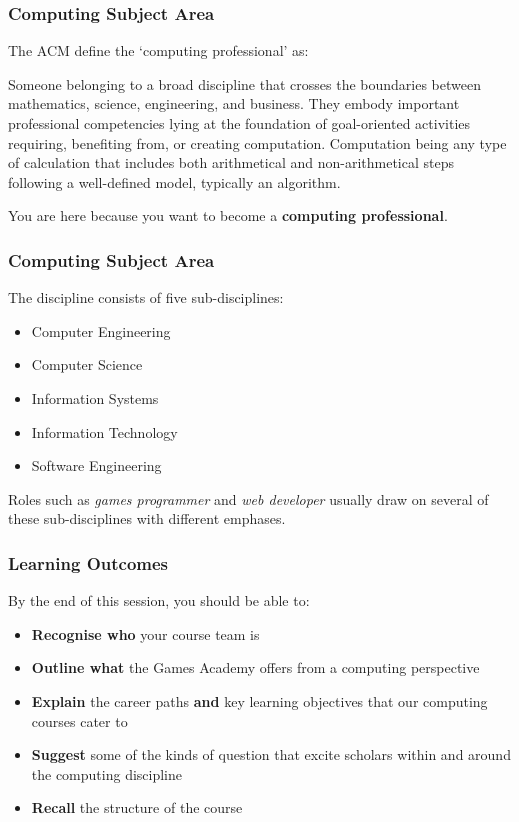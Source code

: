 \begin{frame}
	\frametitle{Computing Subject Area}
	
	The ACM define the `computing professional' as:
	
	\vspace{1em}
	
	Someone belonging to a broad discipline that crosses the boundaries between mathematics, science, engineering, and business. They embody important professional competencies lying at the foundation of goal-oriented activities requiring, benefiting from, or creating computation. Computation being any type of calculation that includes both arithmetical and non-arithmetical steps following a	well-defined model, typically an algorithm.
	
	\vspace{1em}
	
	You are here because you want to become a \textbf{computing professional}.

\end{frame}

\begin{frame}
	\frametitle{Computing Subject Area}
	
	The discipline consists of five sub-disciplines:
	
	\begin{itemize}
		\item Computer Engineering
		\item Computer Science
		\item Information Systems
		\item Information Technology
		\item Software Engineering	
	\end{itemize}

	Roles such as \textit{games programmer} and \textit{web developer} usually draw on several of these sub-disciplines with different emphases.

\end{frame}

\begin{frame}
	\frametitle{Learning Outcomes}
	
	By the end of this session, you should be able to:
	
	\begin{itemize}
		\item \textbf{Recognise who} your course team is
		\item \textbf{Outline what} the Games Academy offers from a computing perspective
		\item \textbf{Explain} the career paths \textbf{and} key learning objectives that our computing courses cater to
		\item \textbf{Suggest} some of the kinds of question that excite scholars within and around the computing discipline
		\item \textbf{Recall} the structure of the course
	\end{itemize}
\end{frame}


